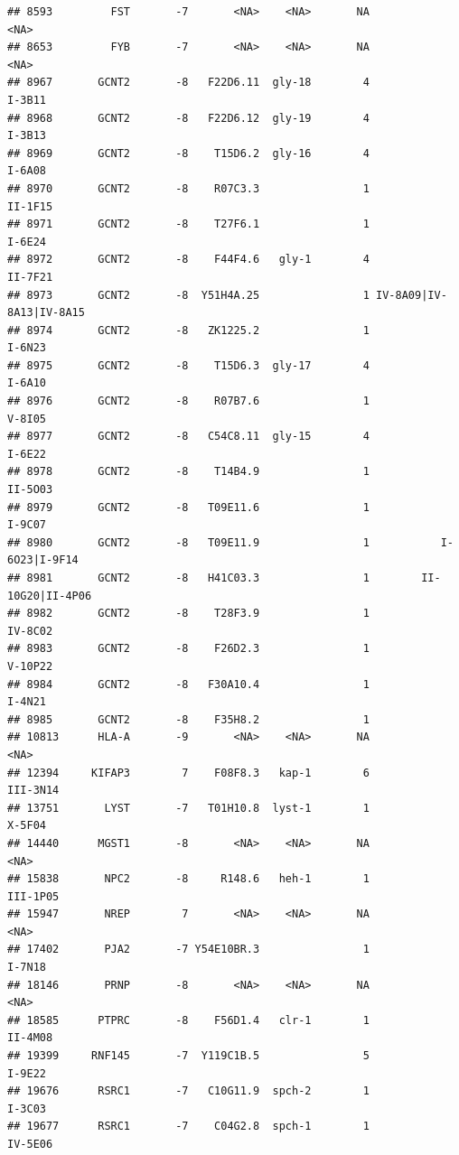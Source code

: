 \documentclass[
]{article}
\begin{document}
\begin{verbatim}
## 8593         FST       -7       <NA>    <NA>       NA                    <NA>
## 8653         FYB       -7       <NA>    <NA>       NA                    <NA>
## 8967       GCNT2       -8   F22D6.11  gly-18        4                  I-3B11
## 8968       GCNT2       -8   F22D6.12  gly-19        4                  I-3B13
## 8969       GCNT2       -8    T15D6.2  gly-16        4                  I-6A08
## 8970       GCNT2       -8    R07C3.3                1                 II-1F15
## 8971       GCNT2       -8    T27F6.1                1                  I-6E24
## 8972       GCNT2       -8    F44F4.6   gly-1        4                 II-7F21
## 8973       GCNT2       -8  Y51H4A.25                1 IV-8A09|IV-8A13|IV-8A15
## 8974       GCNT2       -8   ZK1225.2                1                  I-6N23
## 8975       GCNT2       -8    T15D6.3  gly-17        4                  I-6A10
## 8976       GCNT2       -8    R07B7.6                1                  V-8I05
## 8977       GCNT2       -8   C54C8.11  gly-15        4                  I-6E22
## 8978       GCNT2       -8    T14B4.9                1                 II-5O03
## 8979       GCNT2       -8   T09E11.6                1                  I-9C07
## 8980       GCNT2       -8   T09E11.9                1           I-6O23|I-9F14
## 8981       GCNT2       -8   H41C03.3                1        II-10G20|II-4P06
## 8982       GCNT2       -8    T28F3.9                1                 IV-8C02
## 8983       GCNT2       -8    F26D2.3                1                 V-10P22
## 8984       GCNT2       -8   F30A10.4                1                  I-4N21
## 8985       GCNT2       -8    F35H8.2                1                        
## 10813      HLA-A       -9       <NA>    <NA>       NA                    <NA>
## 12394     KIFAP3        7    F08F8.3   kap-1        6                III-3N14
## 13751       LYST       -7   T01H10.8  lyst-1        1                  X-5F04
## 14440      MGST1       -8       <NA>    <NA>       NA                    <NA>
## 15838       NPC2       -8     R148.6   heh-1        1                III-1P05
## 15947       NREP        7       <NA>    <NA>       NA                    <NA>
## 17402       PJA2       -7 Y54E10BR.3                1                  I-7N18
## 18146       PRNP       -8       <NA>    <NA>       NA                    <NA>
## 18585      PTPRC       -8    F56D1.4   clr-1        1                 II-4M08
## 19399     RNF145       -7  Y119C1B.5                5                  I-9E22
## 19676      RSRC1       -7   C10G11.9  spch-2        1                  I-3C03
## 19677      RSRC1       -7    C04G2.8  spch-1        1                 IV-5E06

\end{verbatim}
\end{document}
